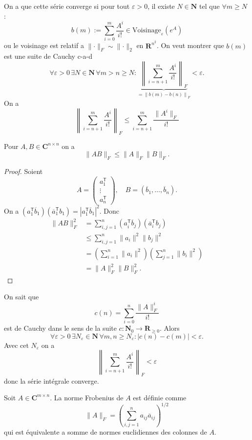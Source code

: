 \begin{answer}
On a que cette série converge si pour tout $\varepsilon>0$, il existe $N\in \mathbf{N}$ tel que $\forall m\ge N$ :
$$
b(m):= \sum_{i=0}^{m} \frac{A^{i}}{i!}\in \mathrm{Voisinage}_{\varepsilon}(e^{A})
$$
ou le voisinage est relatif a $\lVert \cdot \rVert_{F}\sim \lVert \cdot \rVert_{2}$ en $\mathbf{R}^{n^{2}}$. On veut montrer que $b(m)$ est une suite de Cauchy c-a-d
$$
\forall\varepsilon>0\,\exists N\in \mathbf{N}\,\forall m>n\ge N: \underbrace{ \left\lVert  \sum_{i=n+1}^{m} \frac{A^{i}}{i!}  \right\rVert _{F}}_{ =\left\lVert  b(m)-b(n)\right\rVert _{F} }<\varepsilon.
$$
On a 
$$
\left\lVert  \sum_{i=n+1}^{m} \frac{A^{i}}{i!}  \right\rVert _{F} \le \sum_{i=n+1}^{m} \frac{\lVert A^{i} \rVert _{F}}{i!}
$$
\begin{lemma}
Pour $A,B\in \mathbf{C}^{n\times n}$ on a 
$$
\lVert AB \rVert _{F}\le\lVert A \rVert_{F}\lVert B\rVert _{F}.
$$
\end{lemma}
\begin{proof}
Soient
$$
A=\begin{pmatrix}
a_{1}^{\mathsf{T}} \\
\vdots \\
a_{n}^{\mathsf{T}}
\end{pmatrix},\quad B=(\overline{b}_{1},\dots,\overline{b}_{n}).
$$
On a $(a_{1}^{\mathsf{T}}\overline{b}_{1})(\overline{a}_{1}^{\mathsf{T}}b_{1})=|a_{1}^{\mathsf{T}}\overline{b}_{1}|^{2}$. Donc
\begin{align*}
\lVert AB \rVert _{F}^{2} & =\sum _{i,j=1}^{n}(a_{i}^{\mathsf{T}}\overline{b}_{j})(\overline{a}_{i}^{\mathsf{T}}b_{j}) \\
 & \le \sum_{i,j=1}^{n} \lVert a_{i} \rVert ^{2}\lVert b_{j} \rVert ^{2} \\
 & =\left( \sum_{i=1}^{n} \lVert a_{i} \rVert ^{2} \right) \left( \sum_{j=1}^{n} \lVert b_{i} \rVert ^{2} \right) \\
 & =\lVert A \rVert^{2} _{F}\lVert B \rVert ^{2}_{F}.
\end{align*}
\end{proof}

On sait que 
$$
c(n)=\sum_{i=0}^{n} \frac{\lVert A \rVert _{F}^{i}}{i!}
$$
est de Cauchy dans le sens de la suite $c:\mathbf{N}_{0}\to \mathbf{R}_{\ge 0}$. Alors
$$
\forall\varepsilon>0\,\exists N_{\varepsilon}\in \mathbf{N}\,\forall m,n\ge N_{\varepsilon}:|c(n)-c(m)|<\varepsilon.
$$
Avec cet $N_{\varepsilon}$ on a
$$
\left\lVert  \sum_{i=n+1}^{m} \frac{A^{i}}{i!}  \right\rVert _{F}<\varepsilon
$$
donc la série intégrale converge.
\end{answer}
\begin{remark}
Soit $A\in \mathbf{C}^{m\times n}$. La norme Frobenius de $A$ est définie comme
$$
\lVert A \rVert _{F}=\left( \sum _{i,j=1}^{n}a_{ij}\overline{a}_{ij} \right)^{1/2}
$$
qui est équivalente a somme de normes euclidiennes des colonnes de $A$.
\end{remark}

